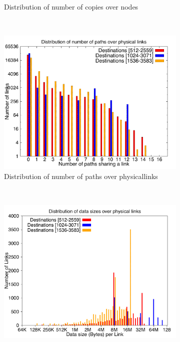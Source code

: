 \begin{figure}[!htbp]
\begin{subfigure}[b]{0.49\textwidth}
                \caption{Distribution of number of copies over nodes}
                \label{fig:incrdist_4k_copy}
        \end{subfigure}
        ~ %
        \begin{subfigure}[b]{0.49\textwidth}
                \includegraphics[width=\textwidth]{report_figures/incrdist/4k/loadpath_histo.pdf}
                \caption{Distribution of number of paths over physicallinks}
                \label{fig:incrdist_4k_loadpath}
        \end{subfigure}
        ~ %
        \begin{subfigure}[b]{0.49\textwidth}
                \includegraphics[width=\textwidth]{report_figures/incrdist/4k/loaddata_histo.pdf}

\end{subfigure}
\end{figure}
